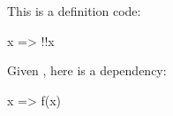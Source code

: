 \begin{definition}[My definition]\label{my_definition}
This is a definition code:
\begin{code}
x => !!x
\end{code}
\end{definition}

\begin{definition}\label{my_second_definition}
Given , here is a dependency:
\begin{code}
x => f(x)
\end{code}
\end{definition}

